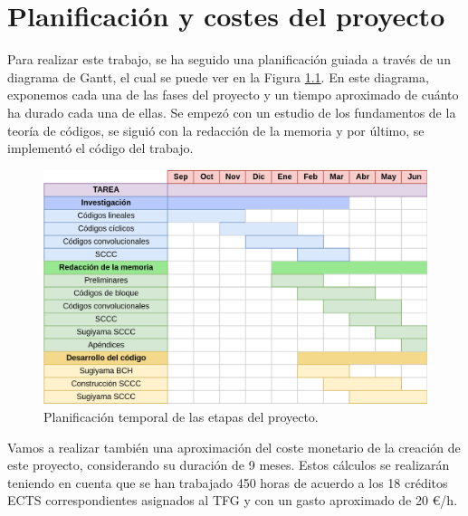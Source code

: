 
\chapter{Planificación y costes del proyecto}\label{ap:pyc}

Para realizar este trabajo, se ha seguido una planificación guiada a través de un diagrama de Gantt, el cual se puede ver en la Figura \ref{fig:proy}. En este diagrama, exponemos cada una de las fases del proyecto y un tiempo aproximado de cuánto ha durado cada una de ellas. Se empezó con un estudio de los fundamentos de la teoría de códigos, se siguió con la redacción de la memoria y por último, se implementó el código del trabajo.

\begin{figure}[h]
    \centering
    \includegraphics[width=1\textwidth]{img/GRANTT.png}
    \caption{Planificación temporal de las etapas del proyecto.}
    \label{fig:proy}
\end{figure}

\newpage

Vamos a realizar también una aproximación del coste monetario de la creación de este proyecto, considerando su duración de 9 meses. Estos cálculos se realizarán teniendo en cuenta que se han trabajado 450 horas de acuerdo a los 18 créditos ECTS correspondientes asignados al TFG y con un gasto aproximado de 20 €/h.


